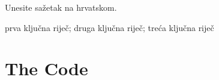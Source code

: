 \documentclass[masterthesis]{fer}
\begin{document}
\begin{sazetak}
  Unesite sažetak na hrvatskom.

  \blindtext
\end{sazetak}

\begin{kljucnerijeci}
  prva ključna riječ; druga ključna riječ; treća ključna riječ
\end{kljucnerijeci}




\backmatter

\chapter{The Code}

\Blindtext
\end{document}
